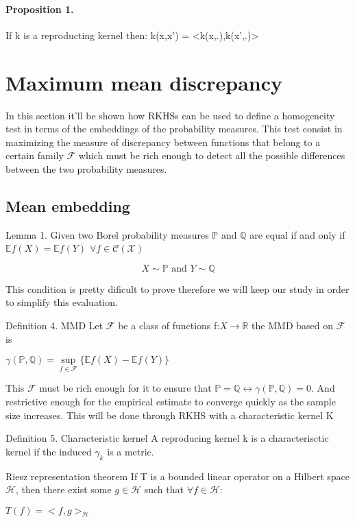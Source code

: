 \documentclass[8pt,a4paper]{article}
\begin{document}
\paragraph*{Proposition 1.}
If k is a reproducting kernel then: k(x,x') = <k(x,.),k(x',.)>
\section{Maximum mean discrepancy}
In this section it'll be shown how RKHSs can be used to define a homogeneity test in terms of the embeddings of the probability measures.
This test consist in maximizing the measure of discrepancy between functions that belong to a certain family $\mathcal{F}$ which must be rich enough to detect all the possible differences between the two probability measures.
\subsection{Mean embedding}
\textsf{Lemma 1.} Given two Borel probability measures $\mathbb{P}$ and $\mathbb{Q}$  are equal if and only if $\mathbb{E}f(X) = \mathbb{E}f(Y)$  $\forall f \in \mathcal{C(X)}$

$$X \sim \mathbb{P} \text{ and } Y \sim \mathbb{Q}$$
\begin{flushleft}
This condition is pretty dificult to prove therefore we will keep our study in order to simplify this evaluation.
\end{flushleft}

\textsf{Definition 4. MMD}
Let $\mathcal{F}$ be a class of functions f:$X \rightarrow \mathbb{R}$ the MMD based on $\mathcal{F}$ is

\begin{center}
$\gamma(\mathbb{P},\mathbb{Q}) = \sup\limits_{f\in\mathcal{F}}\{\mathbb{E}f(X) -\mathbb{E}f(Y)\}$
\end{center}
This $\mathcal{F}$ must be rich enough for it to ensure that $\mathbb{P} = \mathbb{Q} \leftrightarrow \gamma(\mathbb{P},\mathbb{Q}) = 0$. And restrictive enough for the empirical estimate to converge quickly as the sample size increases.
This will be done through RKHS with a characteristic kernel K


\textsf{Definition 5. Characteristic kernel}
A reproducing kernel k is a characterisctic kernel if the induced $\gamma_{k}$ is a metric.

\textsf{Riesz representation theorem}
If T is a bounded linear operator on a Hilbert space $\mathcal{H}$, then there exist some $g \in \mathcal{H}$ such that $\forall f \in \mathcal{H}$:
\begin{center}
$T(f) = <f,g>_{\mathcal{H}}$
\end{center}
\end{document}
